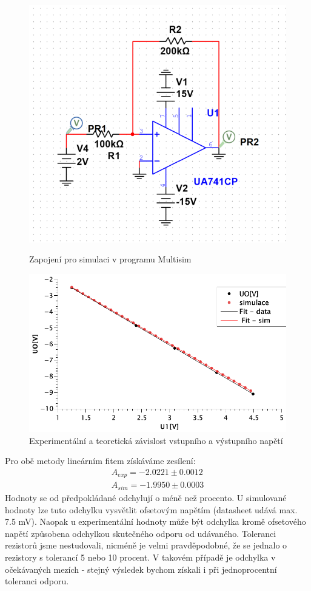 \documentclass[czech,11pt,a4paper]{article}
\begin{document}
\begin{multicols}{2}
\begin{figure}[H]
			\includegraphics[width=0.8\linewidth]{MSinv}
			\caption{Zapojení pro simulaci v programu Multisim}
			\includegraphics[width=0.8\linewidth]{invz}
			\caption{Experimentální a teoretická závislost vstupního a výstupního napětí}
		\end{figure}
		Pro obě metody lineárním fitem získáváme zesílení:
		\begin{gather}
			A_{exp} =  -2.0221 \pm 0.0012    \\
			A_{sim} =   -1.9950 \pm  0.0003    
		\end{gather}
		Hodnoty se od předpokládané odchylují o méně než procento. U simulované hodnoty lze tuto odchylku vysvětlit ofsetovým napětím (datasheet \cite{TI} udává max. 7.5 mV). Naopak u experimentální hodnoty může být odchylka kromě ofsetového napětí způsobena odchylkou skutečného odporu od udávaného. Toleranci rezistorů jsme nestudovali, nicméně je velmi pravděpodobné, že se jednalo o rezistory s tolerancí 5 nebo 10 procent. V takovém případě je odchylka v očekávaných mezích - stejný výsledek bychom získali i při jednoprocentní toleranci odporu.
		

\end{multicols}
\end{document}
